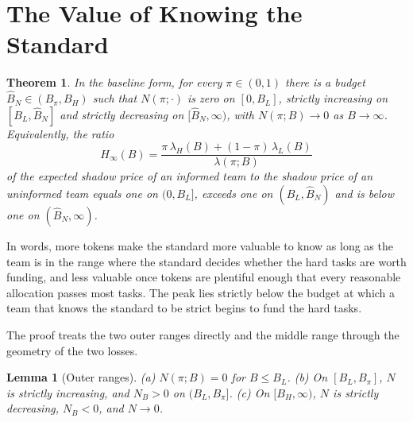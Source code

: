 \documentclass[11pt]{article}
\newtheorem{theorem}{Theorem}
\newtheorem{lemma}{Lemma}
\theoremstyle{definition}
\begin{document}
\section{The Value of Knowing the Standard}

\begin{theorem}\label{th:N}
In the baseline form, for every $\pi\in(0,1)$ there is a budget $\hat B_N\in(B_\pi,B_H)$ such that $N(\pi;\cdot)$ is zero on $[0,B_L]$, strictly increasing on $[B_L,\hat B_N]$ and strictly decreasing on $[\hat B_N,\infty)$, with $N(\pi;B)\to0$ as $B\to\infty$. Equivalently, the ratio
\[
H_\infty(B)=\frac{\pi\,\lambda_H(B)+(1-\pi)\,\lambda_L(B)}{\lambda(\pi;B)}
\]
of the expected shadow price of an informed team to the shadow price of an uninformed team equals one on $(0,B_L]$, exceeds one on $(B_L,\hat B_N)$ and is below one on $(\hat B_N,\infty)$.
\end{theorem}

In words, more tokens make the standard more valuable to know as long as the team is in the range where the standard decides whether the hard tasks are worth funding, and less valuable once tokens are plentiful enough that every reasonable allocation passes most tasks. The peak lies strictly below the budget at which a team that knows the standard to be strict begins to fund the hard tasks.

The proof treats the two outer ranges directly and the middle range through the geometry of the two losses.

\begin{lemma}[Outer ranges]\label{lem:outer}
(a) $N(\pi;B)=0$ for $B\le B_L$. (b) On $[B_L,B_\pi]$, $N$ is strictly increasing, and $N_B>0$ on $(B_L,B_\pi]$. (c) On $[B_H,\infty)$, $N$ is strictly decreasing, $N_B<0$, and $N\to0$.
\end{lemma}
\end{document}
